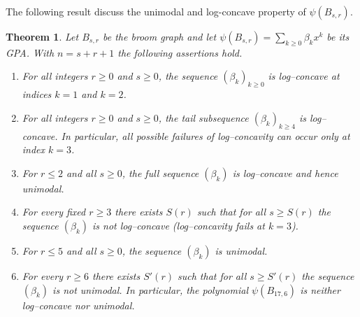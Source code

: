 \documentclass[12pt,twoside]{article}
\newtheorem{theorem}{Theorem}[section]
\begin{document}
The following result discuss the unimodal and log-concave property of $ \psi(B_{s,r}).$
\begin{theorem}\label{prop:broom-unimodality-logconcavity-correct}
	Let $B_{s,r}$ be the broom graph and let $\psi(B_{s,r})=\sum_{k\ge 0} \beta_k x^k$ be its GPA. With $n=s+r+1$  the following assertions hold.
	\begin{enumerate}
		\item For all integers $r\ge 0$ and $s\ge 0$, the sequence $(\beta_k)_{k\ge 0}$ is
		log–concave at indices $k=1$ and $k=2$.
		\item For all integers $r\ge 0$ and $s\ge 0$, the tail subsequence
		$(\beta_k)_{k\ge 4}$ is log–concave. In particular, all possible failures of
		log–concavity can occur only at index $k=3$.
		
		\item For $r\le 2$ and all $s\ge 0$, the full sequence $(\beta_k)$ is
		log–concave and hence unimodal.
		
		\item For every fixed $r\ge 3$ there exists $S(r)$ such that for all
		$s\ge S(r)$ the sequence $(\beta_k)$ is not log–concave (log–concavity fails at
		$k=3$).
		
		\item For $r\le 5$ and all $s\ge 0$, the sequence $(\beta_k)$ is unimodal.
		
		\item For every $r\ge 6$ there exists $S'(r)$ such that for all
		$s\ge S'(r)$ the sequence $(\beta_k)$ is not unimodal. In particular, the polynomial  $\psi(B_{17,6}) $ is neither log–concave  nor unimodal.
	\end{enumerate}
\end{theorem}
\end{document}
